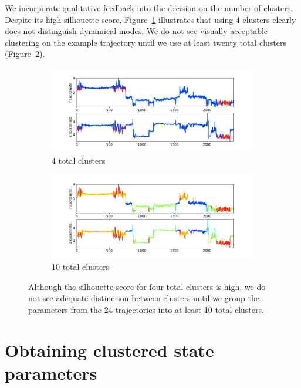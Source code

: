 \documentclass{article}
\begin{document}
  We incorporate qualitative feedback into the decision on the number of 
  clusters. Despite its high silhouette score, Figure~\ref{fig:4cluster_state_sequence}
  illustrates that using 4 clusters clearly does not distinguish dynamical 
  modes. We do not see visually acceptable clustering on the example trajectory
  until we use at least twenty total clusters (Figure~\ref{fig:20cluster_state_sequence}).
  
  \begin{figure}
  \begin{subfigure}{0.9\textwidth}
  \includegraphics[width=1\textwidth]{clustered_traj_MET_ward_4.pdf}
  \caption{4 total clusters}\label{fig:4cluster_state_sequence}
  \end{subfigure}
  \begin{subfigure}{0.9\textwidth}
  \includegraphics[width=1\textwidth]{clustered_traj_MET_ward_10_nolabel.pdf}
  \caption{10 total clusters}\label{fig:20cluster_state_sequence}
  \end{subfigure}
  \caption{Although the silhouette score for four total clusters is high, we do
  not see adequate distinction between clusters until we group the parameters
  from the 24 trajectories into at least 10 total clusters.}\label{fig:clustered_state_sequences}
  \end{figure}

  \section{Obtaining clustered state parameters}\label{section:ihmm_procedure}
  
\end{document}
